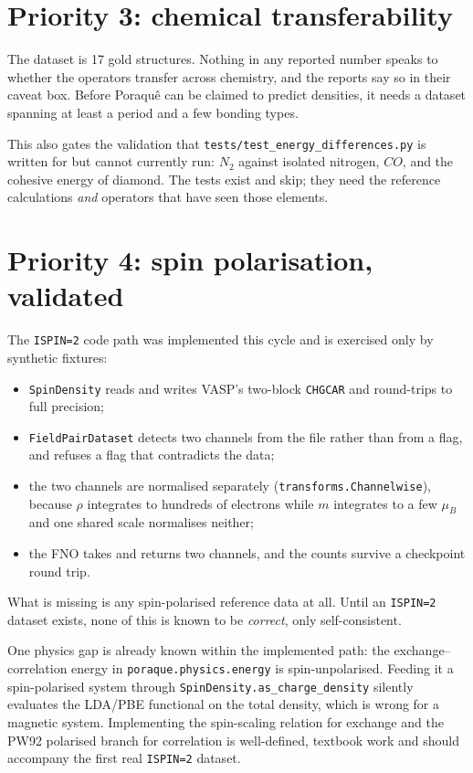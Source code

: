 \documentclass[11pt,a4paper]{report}
\newcommand{\file}[1]{\texttt{#1}}
\newcommand{\opt}[1]{\texttt{#1}}
\newcommand{\pyclass}[1]{\texttt{#1}}
\begin{document}
\section{Priority 3: chemical transferability}

The dataset is 17 gold structures. Nothing in any reported number speaks to
whether the operators transfer across chemistry, and the reports say so in
their caveat box. Before Poraqu\^e can be claimed to predict densities, it needs
a dataset spanning at least a period and a few bonding types.

This also gates the validation that \file{tests/test\_energy\_differences.py}
is written for but cannot currently run: $N_2$ against isolated nitrogen, $CO$,
and the cohesive energy of diamond. The tests exist and skip; they need the
reference calculations \emph{and} operators that have seen those elements.

\section{Priority 4: spin polarisation, validated}

The \opt{ISPIN=2} code path was implemented this cycle and is exercised only by
synthetic fixtures:

\begin{itemize}
\item \pyclass{SpinDensity} reads and writes VASP's two-block \file{CHGCAR}
      and round-trips to full precision;
\item \pyclass{FieldPairDataset} detects two channels from the file rather than
      from a flag, and refuses a flag that contradicts the data;
\item the two channels are normalised separately
      (\pyclass{transforms.Channelwise}), because $\rho$ integrates to hundreds
      of electrons while $m$ integrates to a few $\mu_B$ and one shared scale
      normalises neither;
\item the FNO takes and returns two channels, and the counts survive a
      checkpoint round trip.
\end{itemize}

What is missing is any spin-polarised reference data at all. Until an
\opt{ISPIN=2} dataset exists, none of this is known to be \emph{correct},
only self-consistent.

\begin{pnote}
One physics gap is already known within the implemented path: the
exchange--correlation energy in \pyclass{poraque.physics.energy} is
spin-unpolarised. Feeding it a spin-polarised system through
\pyclass{SpinDensity.as\_charge\_density} silently evaluates the LDA/PBE
functional on the total density, which is wrong for a magnetic system.
Implementing the spin-scaling relation for exchange and the PW92 polarised
branch for correlation is well-defined, textbook work and should accompany the
first real \opt{ISPIN=2} dataset.
\end{pnote}
\end{document}
